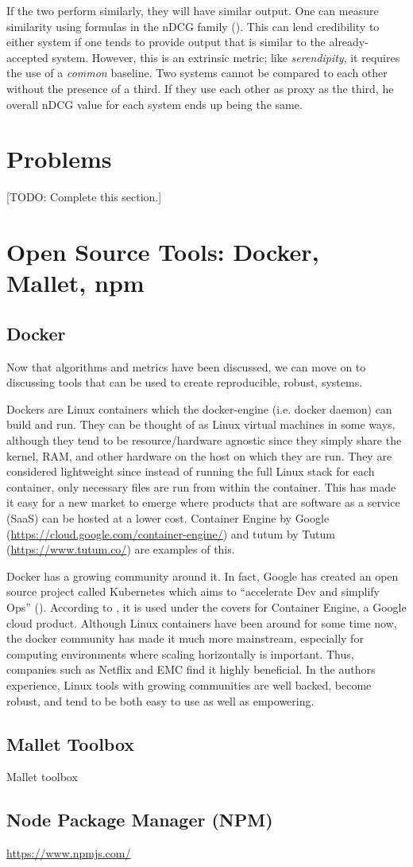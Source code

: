 If the two perform similarly, they will have similar output. One can measure similarity using formulas in the nDCG family (\citealp{Wang:2006:TOT:1150402.1150450}). This can lend credibility to either system if one tends to provide output that is similar to the already-accepted system. However, this is an extrinsic metric; like \emph{serendipity}, it requires the use of a \textit{common} baseline. Two systems cannot be compared to each other without the presence of a third. If they use each other as proxy as the third, he overall nDCG value for each system ends up being the same.


\section{Problems}

[TODO: Complete this section.]


\section{Open Source Tools: Docker, Mallet, npm}

\subsection{Docker\*}
Now that algorithms and metrics have been discussed, we can move on to discussing tools that can be used to create reproducible, robust, systems.

Dockers are Linux containers which the docker-engine (i.e. docker daemon) can build and run. They can be thought of as Linux virtual machines in some ways, although they tend to be resource/hardware agnostic since they simply share the kernel, RAM, and other hardware on the host on which they are run. They are considered lightweight since instead of running the full Linux stack for each container, only necessary files are run from within the container. This has made it easy for a new market to emerge where products that are software as a service (SaaS) can be hosted at a lower cost. Container Engine by Google (\url{https://cloud.google.com/container-engine/}) and tutum by Tutum (\url{https://www.tutum.co/}) are examples of this.

Docker has a growing community around it. In fact, Google has created an open source project called Kubernetes which aims to ``accelerate Dev and simplify Ops'' (\citealp{kube_website}). According to \cite{google_container_engine}, it is used under the covers for Container Engine, a Google cloud product. Although Linux containers have been around for some time now, the docker community has made it much more mainstream, especially for computing environments where scaling horizontally is important. Thus, companies such as Netflix and EMC find it highly beneficial. In the authors experience, Linux tools with growing communities are well backed, become robust, and tend to be both easy to use as well as empowering.

\subsection{Mallet Toolbox}
Mallet toolbox

\subsection{Node Package Manager (NPM)}
 \url{https://www.npmjs.com/}
